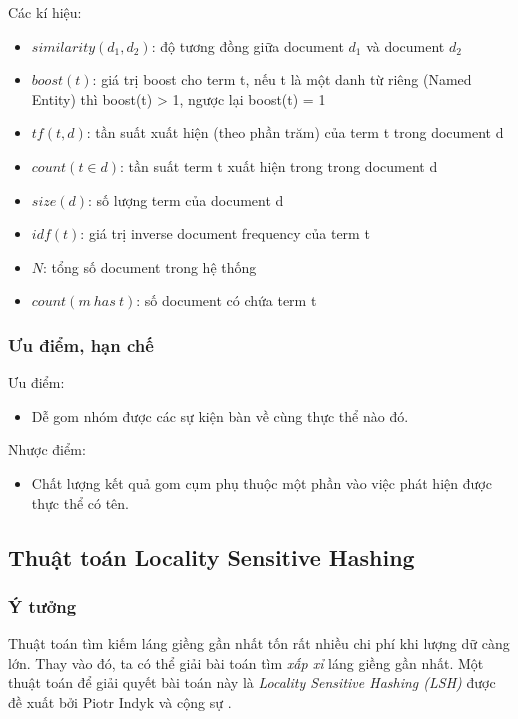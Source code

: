 	Các kí hiệu: 
	\begin{itemize}
		\item $similarity(d_1, d_2)$: độ tương đồng giữa document $d_1$ và document $d_2$
		\item $boost(t)$: giá trị boost cho term t, nếu t là một danh từ riêng (Named Entity) thì boost(t) > 1, ngược lại boost(t) = 1
		\item $tf(t, d)$: tần suất xuất hiện (theo phần trăm) của term t trong document d
		\item $count(t \in d)$: tần suất term t xuất hiện trong trong document d
		\item $size(d)$: số lượng term của document d
		\item $idf(t)$: giá trị inverse document frequency của term t
		\item $N$: tổng số document trong hệ thống
		\item $count(m\ has\ t)$: số document có chứa term t
	\end{itemize}

	\subsubsection{Ưu điểm, hạn chế}
	Ưu điểm:
	\begin{itemize}
		\item Dễ gom nhóm được các sự kiện bàn về cùng thực thể nào đó.
	\end{itemize}
	Nhược điểm:
	\begin{itemize}
		\item Chất lượng kết quả gom cụm phụ thuộc một phần vào việc phát hiện được thực thể có tên.
	\end{itemize}

\subsection{Thuật toán Locality Sensitive Hashing}
	\subsubsection{Ý tưởng}
	Thuật toán tìm kiếm láng giềng gần nhất tốn rất nhiều chi phí khi lượng dữ càng lớn. Thay vào đó, ta có thể giải bài toán tìm \textit{xấp xỉ} láng giềng gần nhất. Một thuật toán để giải quyết bài toán này là \textit{Locality Sensitive Hashing (LSH)} được đề xuất bởi Piotr Indyk và cộng sự \cite{Indyk:LSH-Definition}.
	
